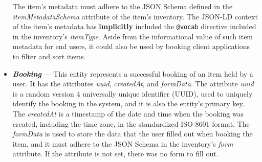 \begin{itemize}
    The item's metadata must adhere to the JSON Schema defined in the \textit{itemMetadataSchema} attribute of the item's inventory. The JSON-LD context of the item's metadata has \textbf{implicitly} included the \texttt{@vocab} directive included in the inventory's \textit{itemType}. Aside from the informational value of such item metadata for end users, it could also be used by booking client applications to filter and sort items.
    \item \textit{\textbf{Booking}} --- This entity represents a successful booking of an item held by a user. It has the attributes \textit{uuid}, \textit{createdAt}, and \textit{formData}. The attribute \textit{uuid} is a random version 4 universally unique identifier (UUID), used to uniquely identify the booking in the system, and it is also the entity's primary key. The \textit{createdAt} is a timestamp of the date and time when the booking was created, including the time zone, in the standardized ISO 8601 format. The \textit{formData} is used to store the data that the user filled out when booking the item, and it must adhere to the JSON Schema in the inventory's \textit{form} attribute. If the attribute is not set, there was no form to fill out.
\end{itemize}

